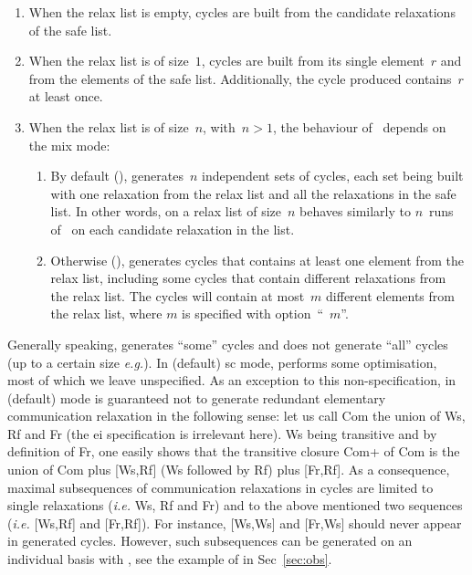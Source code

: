 \begin{enumerate}
\item When the relax list is empty,
cycles are built from the candidate relaxations of the safe list.
\item When the relax list is of size~$1$,
cycles are built from its single element~$r$ and from the elements of
the safe list. Additionally, the cycle produced contains~$r$ at least once.
\item
When the relax list is of size~$n$, with~$n > 1$,
the behaviour of~\diy{} depends on the mix mode:
\begin{enumerate}
\item
By default (),
\diy{} generates~$n$ independent sets of cycles,
each set being built with one relaxation from the relax list and all
the relaxations in the safe list.
In other words, \diy{} on a relax list of size~$n$ behaves similarly
to $n$~runs of~\diy{} on each candidate relaxation in the list.
\item Otherwise (), \diy{} generates cycles that contains
at least one element from the relax list, including some cycles
that contain different relaxations from the relax list.
The cycles will contain at most~$m$ different elements from the relax list,
where $m$ is specified with option~``~$m$''.
\end{enumerate}
\end{enumerate}

\label{mode:describe}Generally
speaking, \diy{} generates ``some'' cycles and does not generate
``all'' cycles (up to a certain size \emph{e.g.}).
In (default) sc mode, \diy{} performs some optimisation,
most of which we leave unspecified.
\label{compose:com}As an exception to
this non-specification, \diy{} in  (default) mode
is guaranteed not to
generate redundant elementary communication relaxation in the following sense:
let us call Com the union of Ws, Rf and Fr (the e\vbar{}i specification
is irrelevant here).
Ws being transitive and by definition of Fr,
one easily shows that the transitive closure Com+ of Com is the union
of Com plus [Ws,Rf] (Ws followed by Rf) plus [Fr,Rf].
As a consequence, maximal subsequences of communication
relaxations in \diy{} cycles are limited
to  single relaxations (\emph{i.e.} Ws, Rf and Fr)
and to the above mentioned two sequences
(\emph{i.e.} [Ws,Rf] and  [Fr,Rf]).
For instance, [Ws,Ws] and [Fr,Ws] should never appear in \diy{} generated
cycles.
However, such subsequences can be generated on an individual basis with
\diyone, see the example of  in Sec~\ref{sec:obs}.

